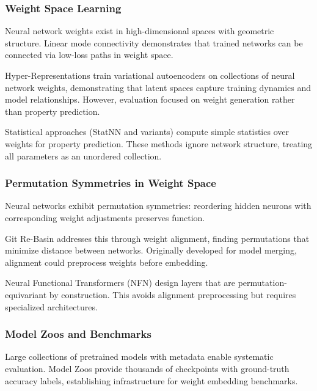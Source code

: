 
\subsubsection{Weight Space Learning}

Neural network weights exist in high-dimensional spaces with geometric structure. Linear mode connectivity demonstrates that trained networks can be connected via low-loss paths in weight space.

Hyper-Representations train variational autoencoders on collections of neural network weights, demonstrating that latent spaces capture training dynamics and model relationships. However, evaluation focused on weight generation rather than property prediction.

Statistical approaches (StatNN and variants) compute simple statistics over weights for property prediction. These methods ignore network structure, treating all parameters as an unordered collection.

\subsubsection{Permutation Symmetries in Weight Space}

Neural networks exhibit permutation symmetries: reordering hidden neurons with corresponding weight adjustments preserves function.

Git Re-Basin addresses this through weight alignment, finding permutations that minimize distance between networks. Originally developed for model merging, alignment could preprocess weights before embedding.

Neural Functional Transformers (NFN) design layers that are permutation-equivariant by construction. This avoids alignment preprocessing but requires specialized architectures.

\subsubsection{Model Zoos and Benchmarks}

Large collections of pretrained models with metadata enable systematic evaluation. Model Zoos provide thousands of checkpoints with ground-truth accuracy labels, establishing infrastructure for weight embedding benchmarks.
